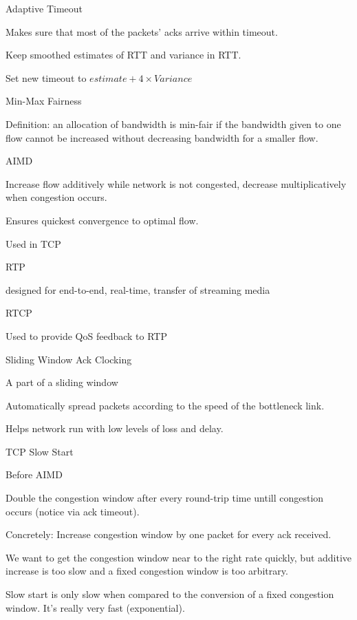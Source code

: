 \documentclass[main.tex]{subfiles}
\begin{document}
\begin{card}{Adaptive Timeout}
\item Makes sure that most of the packets' acks arrive within timeout.
\item Keep smoothed estimates of RTT and variance in RTT.
\item Set new timeout to $estimate + 4\times Variance$
\end{card}

\begin{card}{Min-Max Fairness}
\item Definition: an allocation of bandwidth is min-fair if the bandwidth given to one flow cannot be increased without decreasing bandwidth for a smaller flow.
\end{card}

\begin{card}{AIMD}
\item Increase flow additively while network is not congested, decrease multiplicatively when congestion occurs.
\item Ensures quickest convergence to optimal flow.
\item Used in TCP
\end{card}

\begin{card}{RTP}
\item designed for end-to-end, real-time, transfer of streaming media
\end{card}

\begin{card}{RTCP}
\item Used to provide QoS feedback to RTP
\end{card}

\begin{card}{Sliding Window Ack Clocking}
\item A part of a sliding window
\item Automatically spread packets according to the speed of the bottleneck link.
\item Helps network run with low levels of loss and delay.
\end{card}

\begin{card}{TCP Slow Start}
\item Before AIMD
\item Double the congestion window after every round-trip time untill congestion occurs (notice via ack timeout).
\item Concretely: Increase congestion window by one packet for every ack received.
\item We want to get the congestion window near to the right rate quickly, but additive increase is too slow and a fixed congestion window is too arbitrary.
\item Slow start is only slow when compared to the conversion of a fixed congestion window. It's really very fast (exponential).
\end{card}
\end{document}
